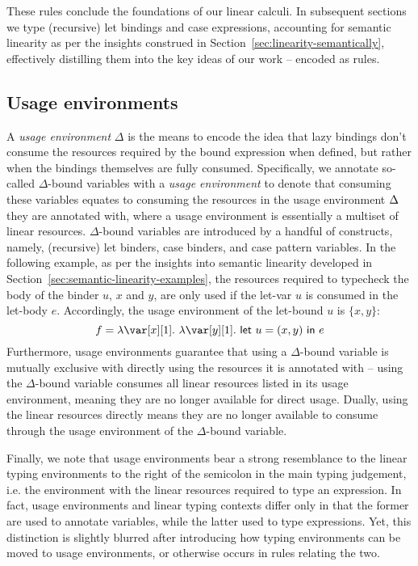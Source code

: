 \documentclass[acmsmall, screen, review]{acmart}
\newcommand{\llet}[2]{\mathsf{let}~#1~\mathsf{in}~#2}
\begin{document}
These rules conclude the foundations of our linear calculi. In subsequent
sections we type (recursive) let bindings and case expressions,
accounting for semantic linearity as per the insights construed in
Section~\ref{sec:linearity-semantically}, effectively distilling them into the
key ideas of our work -- encoded as rules.


\subsection{Usage environments\label{sec:usage-environments}}

A \emph{usage environment} $\Delta$ is the means to encode the idea that lazy
bindings don't consume the resources required by the bound expression when
defined, but rather when the bindings themselves are fully consumed.
Specifically, we annotate so-called $\Delta$-bound variables with a \emph{usage
environment} to denote that consuming these variables equates to consuming the
resources in the usage environment $\Delta$ they are annotated with, where a usage
environment is essentially a multiset of linear resources. $\Delta$-bound
variables are introduced by a handful of constructs, namely, (recursive) let
binders, case binders, and case pattern variables. In the following example, as
per the insights into semantic linearity developed in
Section~\ref{sec:semantic-linearity-examples}, the resources required to
typecheck the body of the binder $u$, $x$ and $y$, are only used if the let-var
$u$ is consumed in the let-body $e$.  Accordingly, the usage environment of
the let-bound $u$ is $\{x,y\}$:
\[
f = \lambda \xl.~\lambda \y[1].~\llet{u = (x,y)}{e}
\]
Furthermore, usage environments guarantee that using a $\Delta$-bound variable
is mutually exclusive with directly using the resources it is annotated with --
using the $\Delta$-bound variable consumes all linear resources listed in its
usage environment, meaning they are no longer available for direct usage.
Dually, using the linear resources directly means they are no longer available
to consume through the usage environment of the $\Delta$-bound variable.

Finally, we note that usage environments bear a strong resemblance to the linear
typing environments to the right of the semicolon in the main typing judgement,
i.e. the environment with the linear resources required to type an expression.
%
In fact, usage environments and linear typing contexts differ only in that the
former are used to annotate variables, while the latter used to type
expressions. Yet, this distinction is slightly blurred after introducing how
typing environments can be moved to usage environments, or otherwise occurs in
rules relating the two.
\end{document}
